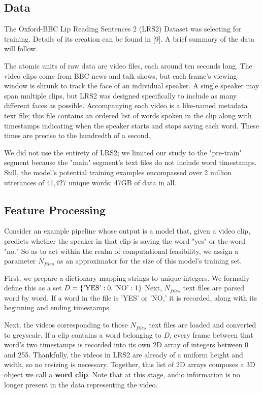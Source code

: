 \documentclass{article}
\begin{document}
\subsection{Data}

The Oxford-BBC Lip Reading Sentences 2 (LRS2) Dataset was selecting for training. Details of its creation can be found in [9]. A brief summary of the data will follow.

The atomic units of raw data are video files, each around ten seconds long. The video clips come from BBC news and talk shows, but each frame's viewing window is shrunk to track the face of an individual speaker. A single speaker may span multiple clips, but LRS2 was designed specifically to include as many different faces as possible. Accompanying each video is a like-named metadata text file; this file contains an ordered list of words spoken in the clip along with timestamps indicating when the speaker starts and stops saying each word. These times are precise to the hundredth of a second.

We did not use the entirety of LRS2; we limited our study to the "pre-train" segment because the "main" segment's text files do not include word timestamps. Still, the model's potential training examples encompassed over 2 million utterances of 41,427 unique words; 47GB of data in all.

\subsection{Feature Processing}

Consider an example pipeline whose output is a model that, given a video clip, predicts whether the speaker in that clip is saying the word "yes" or the word "no." So as to act within the realm of computational feasibility, we assign a parameter $N_{files}$ as an approximator for the size of this model's training set.

First, we prepare a dictionary mapping strings to unique integers. We formally define this as a set $D = \{\hbox{'YES'}: 0, \hbox{'NO'} : 1\}$ Next, $N_{files}$ text files are parsed word by word. If a word in the file is 'YES' or 'NO,' it is recorded, along with its beginning and ending timestamps.

Next, the videos corresponding to those $N_{files}$ text files are loaded and converted to greyscale. If a clip contains a word belonging to $D$, every frame between that word's two timestamps is recorded into its own 2D array of integers between 0 and 255. Thankfully, the videos in LRS2 are already of a uniform height and width, so no resizing is necessary. Together, this list of 2D arrays composes a 3D object we call a \textbf{word clip}. Note that at this stage, audio information is no longer present in the data representing the video.
\end{document}

